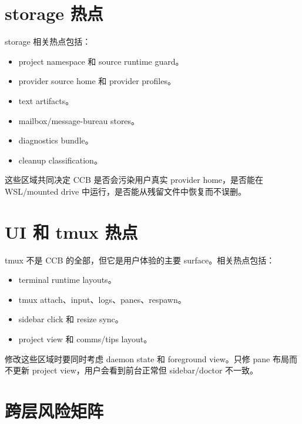 \section{storage 热点}

storage 相关热点包括：

\begin{itemize}
  \item project namespace 和 source runtime guard。
  \item provider source home 和 provider profiles。
  \item text artifacts。
  \item mailbox/message-bureau stores。
  \item diagnostics bundle。
  \item cleanup classification。
\end{itemize}

这些区域共同决定 CCB 是否会污染用户真实 provider home，是否能在 WSL/mounted drive 中运行，是否能从残留文件中恢复而不误删。

\section{UI 和 tmux 热点}

tmux 不是 CCB 的全部，但它是用户体验的主要 surface。相关热点包括：

\begin{itemize}
  \item terminal runtime layouts。
  \item tmux attach、input、logs、panes、respawn。
  \item sidebar click 和 resize sync。
  \item project view 和 comms/tips layout。
\end{itemize}

修改这些区域时要同时考虑 daemon state 和 foreground view。只修 pane 布局而不更新 project view，用户会看到前台正常但 sidebar/doctor 不一致。

\section{跨层风险矩阵}

